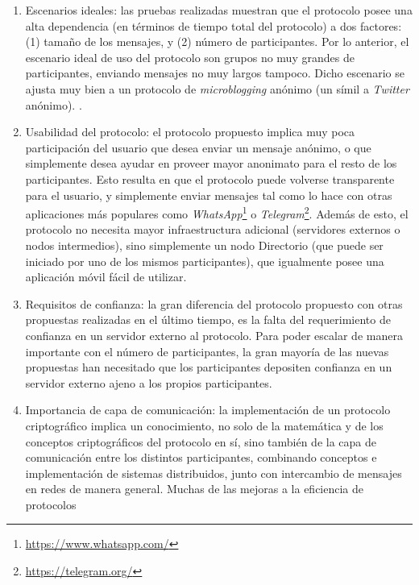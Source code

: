 \begin{enumerate}
    \item Escenarios ideales: las pruebas realizadas muestran que el protocolo posee una 
    alta dependencia (en términos de tiempo total del protocolo) a dos factores: 
    (1) tamaño de los mensajes, y (2) número de participantes. Por lo anterior, el escenario 
    ideal de uso del protocolo son grupos no muy grandes de participantes, enviando mensajes 
    no muy largos tampoco. Dicho escenario se ajusta muy bien a un protocolo de 
    \emph{microblogging} anónimo (un símil a \emph{Twitter} anónimo). .
    \item Usabilidad del protocolo: el protocolo propuesto implica muy poca participación 
    del usuario que desea enviar un mensaje anónimo, o que simplemente desea ayudar en proveer 
    mayor anonimato para el resto de los participantes. Esto resulta en que el protocolo 
    puede volverse transparente para el usuario, y simplemente enviar mensajes tal como lo hace 
    con otras aplicaciones más populares como \emph{WhatsApp}\footnote{\url{https://www.whatsapp.com/}} o 
    \emph{Telegram}\footnote{\url{https://telegram.org/}}. 
    Además de esto, el protocolo no necesita mayor infraestructura adicional (servidores externos o nodos intermedios), sino 
    simplemente un nodo Directorio (que puede ser iniciado por uno de los mismos participantes), 
    que igualmente posee una aplicación móvil fácil de utilizar.
    \item Requisitos de confianza: la gran diferencia del protocolo propuesto con 
    otras propuestas realizadas en el último tiempo, es la falta del requerimiento de 
    confianza en un servidor externo al protocolo. Para poder escalar de manera importante 
    con el número de participantes, la gran mayoría de las nuevas propuestas han necesitado 
    que los participantes depositen confianza en un servidor externo ajeno a los propios 
    participantes. 
    \item Importancia de capa de comunicación: la implementación de un protocolo criptográfico 
    implica un conocimiento, no solo de la matemática y de los conceptos criptográficos del 
    protocolo en sí, sino también de la capa de comunicación entre los distintos participantes, 
    combinando conceptos e implementación de sistemas distribuidos, junto con intercambio de 
    mensajes en redes de manera general. Muchas de las mejoras a la eficiencia de protocolos 

\end{enumerate}
